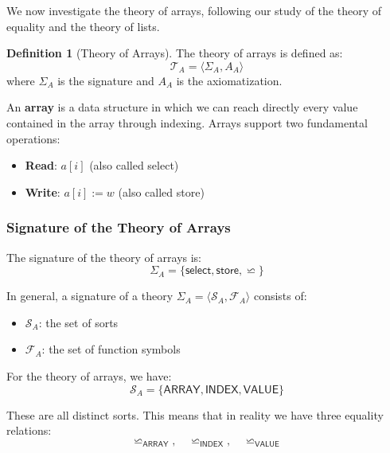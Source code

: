 \documentclass[11pt,a4paper]{article}
\theoremstyle{definition}
\newtheorem{definition}{Definition}[section]
\theoremstyle{plain}
\theoremstyle{remark}
\begin{document}
We now investigate the theory of arrays, following our study of the theory of equality and the theory of lists.

\begin{tcolorbox}[colback=purple!5!white,colframe=purple!75!black,title=\textbf{Theory of Arrays}]
\begin{definition}[Theory of Arrays]
The theory of arrays is defined as:
\[
\mathcal{T}_A = \langle \Sigma_A, A_A \rangle
\]
where $\Sigma_A$ is the signature and $A_A$ is the axiomatization.
\end{definition}
\end{tcolorbox}

An \textbf{array} is a data structure in which we can reach directly every value contained in the array through indexing. Arrays support two fundamental operations:
\begin{itemize}
    \item \textbf{Read}: $a[i]$ (also called \textsf{select})
    \item \textbf{Write}: $a[i] := w$ (also called \textsf{store})
\end{itemize}

\subsubsection{Signature of the Theory of Arrays}

\begin{tcolorbox}[colback=cyan!5!white,colframe=cyan!75!black,title=\textbf{Signature of the Theory of Arrays}]
The signature of the theory of arrays is:
\[
\Sigma_A = \{\textsf{select}, \textsf{store}, \backsimeq\}
\]

In general, a signature of a theory $\Sigma_A = \langle \mathcal{S}_A, \mathcal{F}_A \rangle$ consists of:
\begin{itemize}
    \item $\mathcal{S}_A$: the set of sorts
    \item $\mathcal{F}_A$: the set of function symbols
\end{itemize}

For the theory of arrays, we have:
\[
\mathcal{S}_A = \{\textsf{ARRAY}, \textsf{INDEX}, \textsf{VALUE}\}
\]

These are all distinct sorts. This means that in reality we have three equality relations:
\[
\backsimeq_{\textsf{ARRAY}}, \quad \backsimeq_{\textsf{INDEX}}, \quad \backsimeq_{\textsf{VALUE}}
\]
\end{tcolorbox}
\end{document}
